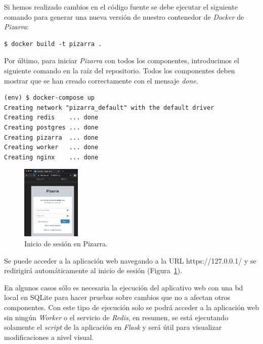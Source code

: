 \documentclass[11pt,spanish,listoffigures,listoftables]{tfgetsinf}
\begin{document}
Si hemos realizado cambios en el código fuente se debe ejecutar el siguiente comando para generar una nueva versión de nuestro \Gls{contenedor} de \textit{Docker} de \textit{Pizarra}: \newline

\begin{lstlisting}[style=ascii-tree]
$ docker build -t pizarra .
\end{lstlisting}

Por último, para iniciar \textit{Pizarra} con todos los componentes, introducimos el siguiente comando en la raíz del repositorio. Todos los componentes deben mostrar que se han creado correctamente con el mensaje \textit{done}. \newline

\begin{lstlisting}[style=ascii-tree]
(env) $ docker-compose up
Creating network "pizarra_default" with the default driver
Creating redis    ... done
Creating postgres ... done
Creating pizarra  ... done
Creating worker   ... done
Creating nginx    ... done
\end{lstlisting}

\begin{figure}
	\includegraphics[width=0.25\textwidth]{img/docker-compose-pizarra}
	\caption[Inicio de sesión en Pizarra]{Inicio de sesión en Pizarra.}
	\label{figura:docker-compose-pizarra}
\end{figure}

Se puede acceder a la aplicación web navegando a la URL https://127.0.0.1/ y se redirigirá automáticamente al inicio de sesión (Figura~\ref{figura:docker-compose-pizarra}).

En algunos casos sólo es necesaria la ejecución del aplicativo web con una \acrshort{bd} local en SQLite para hacer pruebas sobre cambios que no a afectan otros componentes. Con este tipo de ejecución solo se podrá acceder a la aplicación web sin ningún \textit{Worker} o el servicio de \textit{Redis}, en resumen, se está ejecutando solamente el \textit{script} de la aplicación en \textit{Flask} y será útil para visualizar modificaciones a nivel visual.
\end{document}

